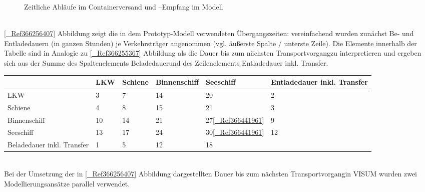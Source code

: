 \begin{figure}[htbp]
  \centering
  \caption{ Zeitliche Abläufe im Containerversand und –Empfang im Modell}
  \label{_Ref366583307}
\end{figure}
~\\
\autoref{_Ref366256407} Abbildung  zeigt die in dem Prototyp-Modell verwendeten Übergangszeiten: vereinfachend wurden zunächst Be- und Entladedauern (in ganzen Stunden) je Verkehrsträger angenommen (vgl. äußerste Spalte / unterste Zeile). Die Elemente innerhalb der Tabelle sind in Analogie zu \autoref{_Ref366255367} Abbildung  als die \glqq Dauer bis zum nächsten Transportvorgang\grqq  zu interpretieren und ergeben sich aus der Summe des Spaltenelements \glqq Beladedauer\grqq  und des Zeilenelements \glqq Entladedauer inkl. Transfer\grqq .
\begin{table}[htbp]
  \centering
\begin{tabular}{|p{3cm}|p{3cm}|p{3cm}|p{3cm}|p{3cm}|p{3cm}|}\hline
  & LKW & Schiene & Binnenschiff & Seeschiff & Entladedauer inkl. Transfer\\\hline
LKW & 3 & 7 & 14 & 20 & 2\\\hline
Schiene & 4 & 8 & 15 & 21 & 3\\\hline
Binnenschiff & 10 & 14 & 21 & 27\autoref{_Ref366441961}  & 9\\\hline
Seeschiff & 13 & 17 & 24 & 30\autoref{_Ref366441961}  & 12\\\hline
Beladedauer inkl. Transfer & 1 & 5 & 12 & 18 &  \\\hline
\end{tabular}
\end{table}
~\\
Bei der Umsetzung der in \autoref{_Ref366256407} Abbildung  dargestellten \glqq Dauer bis zum nächsten Transportvorgang\grqq  in VISUM wurden zwei Modellierungsansätze parallel verwendet.~\\


